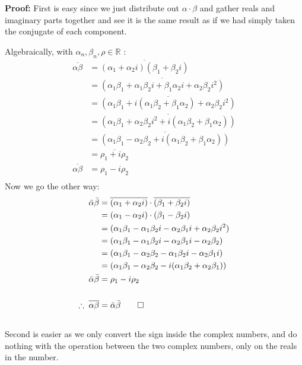 \begin{enumerate}
	      \textbf{Proof:}
	      First is easy since we just distribute out $\alpha\cdot\beta$ and gather reals and imaginary
	      parts together and see it is the same result as if we had simply taken the conjugate of each component.

	      Algebraically, with $\alpha_n, \beta_n, \rho \in \mathbb{R}$ :
	      \begin{align*}
		      \overline{\alpha \beta}
		       & = \overline{(\alpha_1 + \alpha_2 i)(\beta_1 + \beta_2 i)}                                       \\
		       & = \overline{(\alpha_1\beta_1  + \alpha_1\beta_2 i + \beta_1 \alpha_2 i + \alpha_2 \beta_2 i^2)} \\
		       & = \overline{(\alpha_1\beta_1  + i(\alpha_1\beta_2 + \beta_1 \alpha_2) + \alpha_2 \beta_2 i^2)}  \\
		       & = \overline{(\alpha_1\beta_1 + \alpha_2 \beta_2 i^2 + i(\alpha_1\beta_2 + \beta_1 \alpha_2))}   \\
		       & = \overline{(\alpha_1\beta_1 - \alpha_2 \beta_2 + i(\alpha_1\beta_2 + \beta_1 \alpha_2))}       \\
		       & = \overline{\rho_1  + i\rho_2}                                                                  \\
		      \overline{\alpha \beta}
		       & = \rho_1  - i\rho_2                                                                             \\
	      \end{align*}
	      Now we go the other way:
	      \begin{align*}
		      \bar{\alpha}\bar{\beta}
		       & = \overline{(\alpha_1 + \alpha_2 i)} \cdot \overline{(\beta_1 + \beta_2 i)}      \\
		       & = (\alpha_1 - \alpha_2 i) \cdot (\beta_1 - \beta_2 i)                            \\
		       & = (\alpha_1\beta_1 - \alpha_1\beta_2i -\alpha_2\beta_1 i + \alpha_2\beta_2 i^2 ) \\
		       & = (\alpha_1\beta_1 - \alpha_1\beta_2i -\alpha_2\beta_1 i - \alpha_2\beta_2 )     \\
		       & = (\alpha_1\beta_1 - \alpha_2\beta_2 - \alpha_1\beta_2i -\alpha_2\beta_1 i )     \\
		       & = (\alpha_1\beta_1 - \alpha_2\beta_2 - i(\alpha_1\beta_2 + \alpha_2\beta_1) )    \\
		      \bar{\alpha}\bar{\beta}
		       & = \rho_1 - i\rho_2                                                               \\
		      \\
		      \therefore \;  \overline{\alpha\beta}
		       & = \bar{\alpha}\bar{\beta}
		      \qed
	      \end{align*}
	      \\
	      Second is easier as we only convert the sign inside the complex numbers, and do nothing with the operation
	      between the two complex numbers, only on the reals in the number.


\end{enumerate}
